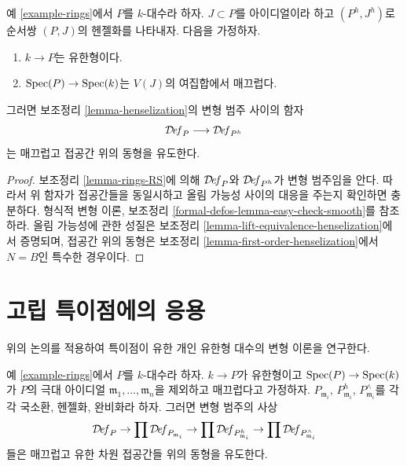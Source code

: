 \begin{lemma}
\label{lemma-smooth-henselization}
예 \ref{example-rings}에서 $P$를 $k$-대수라 하자. $J \subset P$를
아이디얼이라 하고 $(P^h, J^h)$로 순서쌍 $(P, J)$의 헨젤화를 나타내자.
다음을 가정하자.
\begin{enumerate}
\item $k \to P$는 유한형이다.
\item $\mathop{\mathrm{Spec}}(P) \to \mathop{\mathrm{Spec}}(k)$는 $V(J)$의 여집합에서 매끄럽다.
\end{enumerate}
그러면 보조정리 \ref{lemma-henselization}의 변형 범주 사이의 함자
$$
\mathcal{D}\!\mathit{ef}_P \longrightarrow \mathcal{D}\!\mathit{ef}_{P^h}
$$
는 매끄럽고 접공간 위의 동형을 유도한다.
\end{lemma}

\begin{proof}
보조정리 \ref{lemma-rings-RS}에 의해 $\mathcal{D}\!\mathit{ef}_P$와
$\mathcal{D}\!\mathit{ef}_{P^h}$가 변형 범주임을 안다. 따라서 위 함자가
접공간들을 동일시하고 올림 가능성 사이의 대응을 주는지 확인하면
충분하다. 형식적 변형 이론, 보조정리
\ref{formal-defos-lemma-easy-check-smooth}를 참조하라. 올림 가능성에 관한
성질은 보조정리 \ref{lemma-lift-equivalence-henselization}에서 증명되며,
접공간 위의 동형은 보조정리 \ref{lemma-first-order-henselization}에서
$N = B$인 특수한 경우이다.
\end{proof}



\section{고립 특이점에의 응용}
\label{section-isolated}

\noindent
위의 논의를 적용하여 특이점이 유한 개인 유한형 대수의 변형 이론을
연구한다.

\begin{lemma}
\label{lemma-isolated}
예 \ref{example-rings}에서 $P$를 $k$-대수라 하자. $k \to P$가 유한형이고
$\mathop{\mathrm{Spec}}(P) \to \mathop{\mathrm{Spec}}(k)$가 $P$의 극대 아이디얼
$\mathfrak m_1, \ldots, \mathfrak m_n$을 제외하고 매끄럽다고 가정하자.
$P_{\mathfrak m_i}$, $P_{\mathfrak m_i}^h$,
$P_{\mathfrak m_i}^\wedge$를 각각 국소환, 헨젤화, 완비화라 하자.
그러면 변형 범주의 사상
$$
\mathcal{D}\!\mathit{ef}_P \to
\prod \mathcal{D}\!\mathit{ef}_{P_{\mathfrak m_i}} \to
\prod \mathcal{D}\!\mathit{ef}_{P_{\mathfrak m_i}^h} \to
\prod \mathcal{D}\!\mathit{ef}_{P_{\mathfrak m_i}^\wedge}
$$
들은 매끄럽고 유한 차원 접공간들 위의 동형을 유도한다.
\end{lemma}

